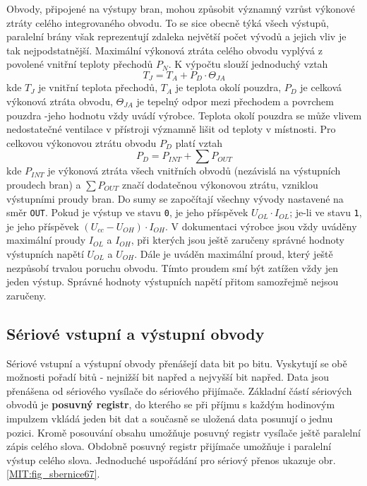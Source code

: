     Obvody, připojené na výstupy bran, mohou způsobit významný vzrůst výkonové ztráty celého
    integrovaného obvodu. To se sice obecně týká všech výstupů, paralelní brány však reprezentují
    zdaleka největší počet vývodů a jejich vliv je tak nejpodstatnější. Maximální výkonová ztráta
    celého obvodu vyplývá z povolené vnitřní teploty přechodů \(P_N\). K výpočtu slouží jednoduchý
    vztah
    \begin{equation*}
      T_J = T_A + P_D\cdot \varTheta_{JA}
    \end{equation*}
    kde \(T_J\) je vnitřní teplota přechodů, \(T_A\) je teplota okolí pouzdra, \(P_D\) je celková 
    výkonová ztráta obvodu, \(\varTheta_{JA}\) je tepelný odpor mezi přechodem a povrchem pouzdra 
    -jeho hodnotu vždy uvádí výrobce. Teplota okolí pouzdra se může vlivem nedostatečné ventilace v 
    přístroji významně lišit od teploty v místnosti. Pro celkovou výkonovou ztrátu obvodu \(P_D\) 
    platí vztah
    \begin{equation*}
      P_D = P_{INT} + \sum P_{OUT}
    \end{equation*}
    kde \(P_{INT}\) je výkonová ztráta všech vnitřních obvodů (nezávislá na výstupních proudech
    bran) a \(\sum P_{OUT}\) značí dodatečnou výkonovou ztrátu, vzniklou výstupními proudy bran. Do
    sumy se započítají všechny vývody nastavené na směr \texttt{OUT}. Pokud je výstup ve stavu
    \texttt{0}, je jeho příspěvek \(U_{OL}\cdot I_{OL}\); je-li ve stavu \texttt{1}, je jeho
    příspěvek \((U_{cc} - U_{OH}) \cdot I_{OH}\). V dokumentaci výrobce jsou vždy uváděny maximální
    proudy \(I_{OL}\) a \(I_{OH}\), při kterých jsou ještě zaručeny správné hodnoty výstupních
    napětí \(U_{OL}\) a \(U_{OH}\). Dále je uváděn maximální proud, který ještě nezpůsobí trvalou
    poruchu obvodu. Tímto proudem smí být zatížen vždy jen jeden výstup. Správné hodnoty výstupních
    napětí přitom samozřejmě nejsou zaručeny.
      
    \subsection{Sériové vstupní a výstupní obvody} 
      Sériové vstupní a výstupní obvody přenášejí data bit po bitu. Vyskytují se obě možnosti pořadí
      bitů - nejnižší bit napřed a nejvyšší bit napřed. Data jsou přenášena od sériového vysílače do
      sériového přijímače. Základní částí sériových obvodů je \textbf{posuvný registr}, do kterého
      se při příjmu s každým hodinovým impulzem vkládá jeden bit dat a současně se uložená data
      posunují o jednu pozici. Kromě posouvání obsahu umožňuje posuvný registr vysílače ještě
      paralelní zápis celého slova. Obdobně posuvný registr přijímače umožňuje i paralelní výstup
      celého slova. Jednoduché uspořádání pro sériový přenos ukazuje obr. \ref{MIT:fig_sbernice67}.
    

